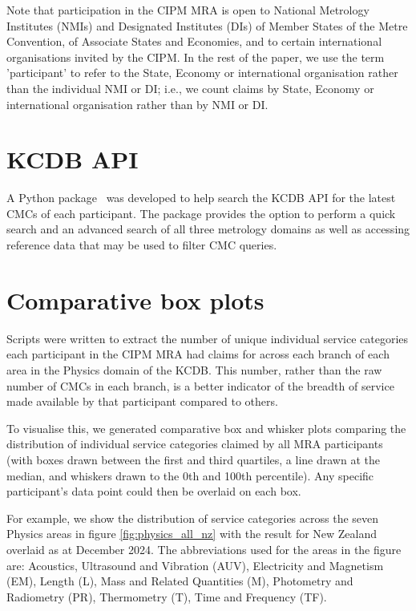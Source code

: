 \documentclass[
	a4paper, %
	10pt, %
	unnumberedsections, %
	twoside, %
]{LTJournalArticle}
\begin{document}
Note that participation in the CIPM MRA is open to National Metrology Institutes (NMIs) and Designated Institutes (DIs) of Member States of the Metre Convention, of Associate States and Economies, and to certain international organisations invited by the CIPM. In the rest of the paper, we use the term 'participant' to refer to the State, Economy or international organisation rather than the individual NMI or DI; i.e., we count claims by State, Economy or international organisation rather than by NMI or DI.


\section{KCDB API}

A Python package~\cite{MSLKCDB} was developed to help search the KCDB API for the latest CMCs of each participant. The package provides the option to perform a quick search and an advanced search of all three metrology domains as well as accessing reference data that may be used to filter CMC queries.

\section{Comparative box plots}

Scripts were written to extract the number of unique individual service categories each participant in the CIPM MRA had claims for across each branch of each area in the Physics domain of the KCDB. This number, rather than the raw number of CMCs in each branch, is a better indicator of the breadth of service made available by that participant compared to others.

To visualise this, we generated comparative box and whisker plots comparing the distribution of individual service categories claimed by all MRA participants (with boxes drawn between the first and third quartiles, a line drawn at the median, and whiskers drawn to the 0th and 100th percentile). Any specific participant's data point could then be overlaid on each box.

For example, we show the distribution of service categories across the seven Physics areas in figure \ref{fig:physics_all_nz} with the result for New Zealand overlaid as at December 2024.
The abbreviations used for the areas in the figure are: Acoustics, Ultrasound and Vibration (AUV), Electricity and Magnetism (EM), Length (L), Mass and Related Quantities (M), Photometry and Radiometry (PR), Thermometry (T), Time and Frequency (TF).
\end{document}
